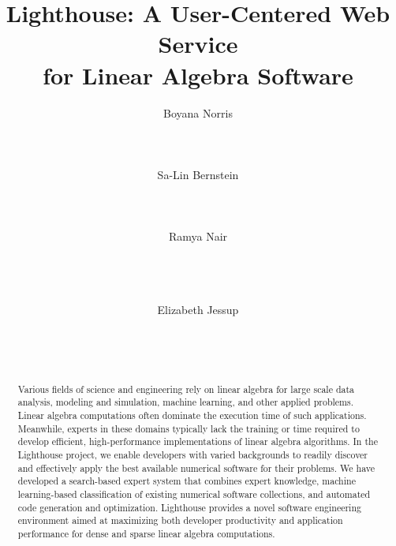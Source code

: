 \documentclass{sig-alternate}
\begin{document}


\title{Lighthouse: A User-Centered Web Service\\
        for Linear Algebra Software}
        


 \author{
\alignauthor
Boyana Norris\\
       \\
       \\
       \\
\alignauthor
Sa-Lin Bernstein\\
       \\
       \\
       \\
\alignauthor
Ramya Nair\\
       \\
       \\
       \\
\and
\alignauthor
Elizabeth Jessup\\
       \\
       \\
       \\
}
\maketitle


\begin{abstract}
Various fields of science and engineering rely on linear algebra 
for large scale data analysis, modeling and simulation, machine learning, and
other applied problems. Linear algebra computations often dominate the
execution time of such applications. Meanwhile, experts in these domains typically
lack the training or time required to develop efficient, high-performance
implementations of linear algebra algorithms. In the Lighthouse project, we
enable developers with varied backgrounds to readily discover and
effectively apply the best available numerical software for their problems. We
have developed a search-based expert system that combines expert knowledge, machine
learning-based classification of existing numerical software collections, and
automated code generation and optimization. 
Lighthouse provides a novel software engineering environment 
aimed at
maximizing both developer productivity and application performance
for dense and sparse linear algebra computations.
\end{abstract}
\end{document}
